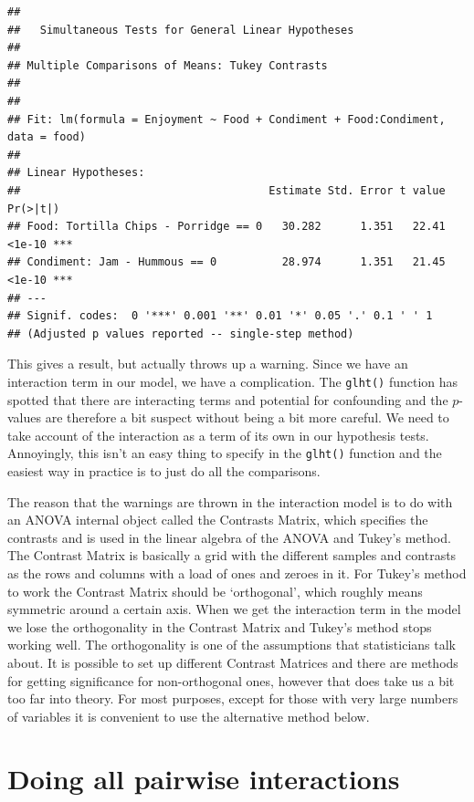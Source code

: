 \documentclass[
]{book}
\newenvironment{sidenote}
{ \begin{tcolorbox}[colbacktitle=blue!50!white,
title=huh?,coltitle=white,
fonttitle=\bfseries] }
{  \end{tcolorbox} }
\begin{document}
\begin{verbatim}
## 
## 	 Simultaneous Tests for General Linear Hypotheses
## 
## Multiple Comparisons of Means: Tukey Contrasts
## 
## 
## Fit: lm(formula = Enjoyment ~ Food + Condiment + Food:Condiment, data = food)
## 
## Linear Hypotheses:
##                                      Estimate Std. Error t value Pr(>|t|)    
## Food: Tortilla Chips - Porridge == 0   30.282      1.351   22.41   <1e-10 ***
## Condiment: Jam - Hummous == 0          28.974      1.351   21.45   <1e-10 ***
## ---
## Signif. codes:  0 '***' 0.001 '**' 0.01 '*' 0.05 '.' 0.1 ' ' 1
## (Adjusted p values reported -- single-step method)
\end{verbatim}

This gives a result, but actually throws up a warning. Since we have an interaction term in our model, we have a complication. The \texttt{glht()} function has spotted that there are interacting terms and potential for confounding and the \(p\)-values are therefore a bit suspect without being a bit more careful. We need to take account of the interaction as a term of its own in our hypothesis tests. Annoyingly, this isn't an easy thing to specify in the \texttt{glht()} function and the easiest way in practice is to just do all the comparisons.

\begin{sidenote}
The reason that the warnings are thrown in the interaction model is to do with an ANOVA internal object called the Contrasts Matrix, which specifies the contrasts and is used in the linear algebra of the ANOVA and Tukey's method. The Contrast Matrix is basically a grid with the different samples and contrasts as the rows and columns with a load of ones and zeroes in it. For Tukey's method to work the Contrast Matrix should be `orthogonal', which roughly means symmetric around a certain axis. When we get the interaction term in the model we lose the orthogonality in the Contrast Matrix and Tukey's method stops working well. The orthogonality is one of the assumptions that statisticians talk about. It is possible to set up different Contrast Matrices and there are methods for getting significance for non-orthogonal ones, however that does take us a bit too far into theory. For most purposes, except for those with very large numbers of variables it is convenient to use the alternative method below.
\end{sidenote}

\hypertarget{doing-all-pairwise-interactions}{%
\section{Doing all pairwise interactions}\label{doing-all-pairwise-interactions}}
\end{document}
